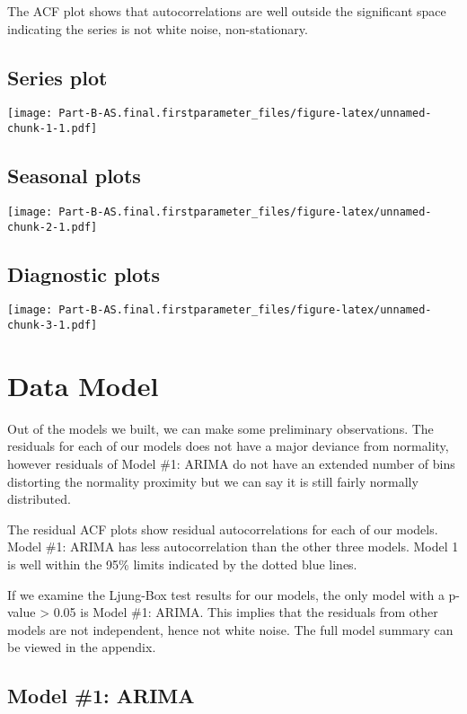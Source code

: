 \documentclass[openany]{book}
\begin{document}
The ACF plot shows that autocorrelations are well outside the
significant space indicating the series is not white noise,
non-stationary.

\subsection{Series plot}\label{series-plot}

\texttt{[image: Part-B-AS.final.firstparameter\_files/figure-latex/unnamed-chunk-1-1.pdf]}

\subsection{Seasonal plots}\label{seasonal-plots}

\texttt{[image: Part-B-AS.final.firstparameter\_files/figure-latex/unnamed-chunk-2-1.pdf]}

\subsection{Diagnostic plots}\label{diagnostic-plots}

\texttt{[image: Part-B-AS.final.firstparameter\_files/figure-latex/unnamed-chunk-3-1.pdf]}

\section*{Data Model}\label{b-model}

Out of the models we built, we can make some preliminary observations.
The residuals for each of our models does not have a major deviance from
normality, however residuals of Model \#1: ARIMA do not have an extended
number of bins distorting the normality proximity but we can say it is
still fairly normally distributed.

The residual ACF plots show residual autocorrelations for each of our
models. Model \#1: ARIMA has less autocorrelation than the other three
models. Model 1 is well within the 95\% limits indicated by the dotted
blue lines.

If we examine the Ljung-Box test results for our models, the only model
with a p-value \textgreater{} 0.05 is Model \#1: ARIMA. This implies
that the residuals from other models are not independent, hence not
white noise. The full model summary can be viewed in the appendix.

\subsection{Model \#1: ARIMA}\label{model-1-arima}
\end{document}
